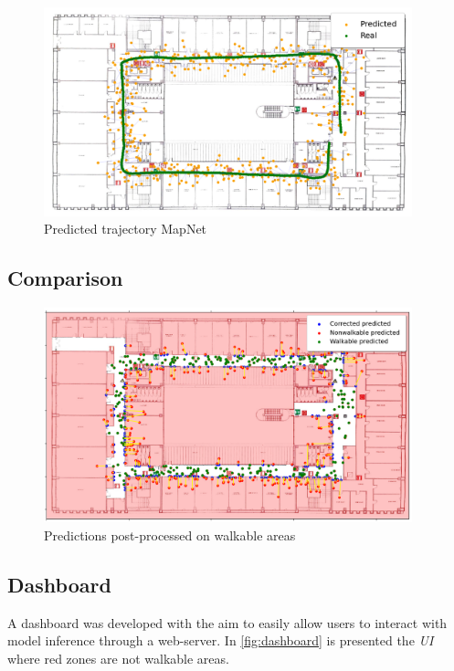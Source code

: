 \begin{figure}[h]
    \begin{center}
        \includegraphics[width=0.95\textwidth]{./imgs/mapnet_map.png}
    \end{center}
    \caption{Predicted trajectory MapNet}
    \label{fig:trajectory-mapnet}
\end{figure}

\subsection{Comparison}
\begin{figure}[h]
    \begin{center}
        \includegraphics[width=0.95\textwidth]{./imgs/walkable_postprocess.png}
    \end{center}
    \caption{Predictions post-processed on walkable areas}
    \label{fig:trajectory-mapnet}
\end{figure}

\subsection{Dashboard}
A dashboard was developed with the aim to easily allow users to interact with model inference through a web-server. In \cref{fig:dashboard} is presented the \textit{UI} where red zones are not walkable areas.

